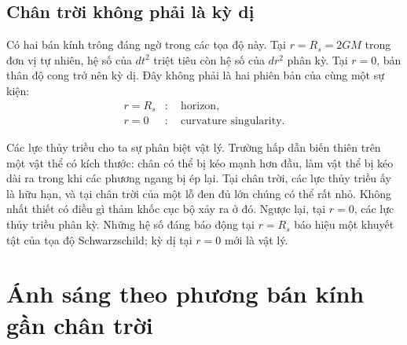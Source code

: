 
\subsection{Chân trời không phải là kỳ dị}

Có hai bán kính trông đáng ngờ trong các tọa độ này. Tại \(r=R_s=2GM\) trong đơn vị tự nhiên, hệ số của \(dt^2\) triệt tiêu còn hệ số của \(dr^2\) phân kỳ. Tại \(r=0\), bản thân độ cong trở nên kỳ dị. Đây không phải là hai phiên bản của cùng một sự kiện:
\begin{equation}
\begin{aligned}
r=R_s &:\quad \text{horizon},\\
r=0 &:\quad \text{curvature singularity}.
\end{aligned}
\end{equation}

Các lực thủy triều cho ta sự phân biệt vật lý. Trường hấp dẫn biến thiên trên một vật thể có kích thước: chân có thể bị kéo mạnh hơn đầu, làm vật thể bị kéo dài ra trong khi các phương ngang bị ép lại. Tại chân trời, các lực thủy triều ấy là hữu hạn, và tại chân trời của một lỗ đen đủ lớn chúng có thể rất nhỏ. Không nhất thiết có điều gì thảm khốc cục bộ xảy ra ở đó. Ngược lại, tại \(r=0\), các lực thủy triều phân kỳ. Những hệ số đáng báo động tại \(r=R_s\) báo hiệu một khuyết tật của tọa độ Schwarzschild; kỳ dị tại \(r=0\) mới là vật lý.


\section{Ánh sáng theo phương bán kính gần chân trời}

